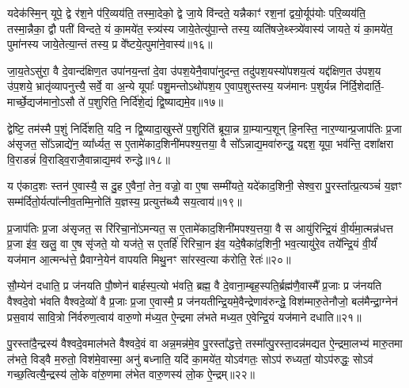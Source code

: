यदेक॑स्मि॒न् यूपे॒ द्वे र॑श॒ने प॑रि॒व्यय॑ति॒ तस्मा॒देको॒ द्वे जा॒ये वि॑न्दते॒ यन्नैकाꣳ॑ रश॒नां द्वयो॒र्यूप॑योः परि॒व्यय॑ति॒ तस्मा॒न्नैका॒ द्वौ पती॑ विन्दते॒ यं का॒मये॑त॒ स्त्र्य॑स्य जाये॒तेत्यु॑पा॒न्ते तस्य॒ व्यति॑षजे॒थ्स्त्र्ये॑वास्य॑ जायते॒ यं का॒मये॑त॒ पुमा॑नस्य जाये॒तेत्या॒न्तं तस्य॒ प्र वे᳚ष्टये॒त्पुमा॑ने॒वास्य॑॥१६॥

जा॒य॒ते\-ऽसु॑रा॒ वै दे॒वान्द॑क्षिण॒त उपा॑नय॒न्तां दे॒वा उ॑पश॒येनै॒वापा॑नुदन्त॒ तदु॑पश॒यस्यो॑पशय॒त्वं यद्द॑क्षिण॒त उ॑पश॒य उ॑प॒शये॒ भ्रातृ॑व्यापनुत्त्यै॒ सर्वे॒ वा अ॒न्ये यूपाः᳚ पशु॒मन्तो\-ऽथो॑पश॒य ए॒वाप॒शुस्तस्य॒ यज॑मानः प॒शुर्यन्न नि॑र्दि॒शेदार्ति॒- मार्च्छे॒द्यज॑मानो॒\-ऽसौ ते॑ प॒शुरिति॒ निर्दि॑शे॒द्यं द्वि॒ष्याद्यमे॒व॥१७॥

द्वेष्टि॒ तम॑स्मै प॒शुं निर्दि॑शति॒ यदि॒ न द्वि॒ष्यादा॒खुस्ते॑ प॒शुरिति॑ ब्रूया॒न्न ग्रा॒म्यान्प॒शून् हि॒नस्ति॒ नार॒ण्यान्प्र॒जाप॑तिः प्र॒जा अ॑सृजत॒ सो᳚\-ऽन्नाद्ये॑न॒ व्या᳚र्ध्यत॒ स ए॒तामे॑काद॒शिनी॑मपश्य॒त्तया॒ वै सो᳚\-ऽन्नाद्य॒मवा॑रुन्द्ध॒ यद्दश॒ यूपा॒ भव॑न्ति॒ दशा᳚क्षरा वि॒राडन्नं॑ वि॒राड्वि॒राजै॒वान्नाद्य॒मव॑ रुन्द्धे॥१८॥

य ए॑काद॒शः स्तन॑ ए॒वास्यै॒ स दु॒ह ए॒वैनां॒ तेन॒ वज्रो॒ वा ए॒षा सम्मी॑यते॒ यदे॑काद॒शिनी॒ सेश्व॒रा पु॒रस्ता᳚त्प्र॒त्यञ्चं॑ य॒ज्ञꣳ सम्म॑र्दितो॒र्यत्पा᳚त्नीव॒तम्मि॒नोति॑ य॒ज्ञस्य॒ प्रत्युत्त॑ब्ध्यै सय॒त्वाय॑॥१९॥

{\anuvakamend[{वै सम॑ष्ट्यै॒ पुमा॑ने॒वास्य॒ यमे॒व रु॑न्धे त्रि॒ꣳ॒शच्च॑॥४॥}]}

प्र॒जाप॑तिः प्र॒जा अ॑सृजत॒ स रि॑रिचा॒नो॑\-ऽमन्यत॒ स ए॒तामे॑काद॒शिनी॑मपश्य॒त्तया॒ वै स आयु॑रिन्द्रि॒यं वी॒र्य॑मा॒त्मन्न॑धत्त प्र॒जा इ॑व॒ खलु॒ वा ए॒ष सृ॑जते॒ यो यज॑ते॒ स ए॒तर्\mbox{}हि॑ रिरिचा॒न इ॑व॒ यदे॒षैका॑द॒शिनी॒ भव॒त्यायु॑रे॒व तये᳚न्द्रि॒यं वी॒र्यं॑ यज॑मान आ॒त्मन्ध॑त्ते॒ प्रैवाग्ने॒येन॑ वापयति मिथु॒नꣳ सा॑रस्व॒त्या क॑रोति॒ रेतः॑॥२०॥

सौ॒म्येन॑ दधाति॒ प्र ज॑नयति पौ॒ष्णेन॑ बार्\mbox{}हस्प॒त्यो भ॑वति॒ ब्रह्म॒ वै दे॒वाना॒म्बृह॒स्पति॒र्ब्रह्म॑णै॒वास्मै᳚ प्र॒जाः प्र ज॑नयति वैश्वदे॒वो भ॑वति वैश्वदे॒व्यो॑ वै प्र॒जाः प्र॒जा ए॒वास्मै॒ प्र ज॑नयतीन्द्रि॒यमे॒वैन्द्रेणाव॑रुन्द्धे॒ विश॑म्मारु॒तेनौजो॒ बल॑मैन्द्रा॒ग्नेन॑ प्रस॒वाय॑ सावि॒त्रो नि॑र्वरुण॒त्वाय॑ वारु॒णो म॑ध्य॒त ऐ॒न्द्रमा ल॑भते मध्य॒त ए॒वेन्द्रि॒यं यज॑माने दधाति॥२१॥

पु॒रस्ता॑दै॒न्द्रस्य॑ वैश्वदे॒वमाल॑भते वैश्वदे॒वं वा अन्न॒मन्न॑मे॒व पु॒रस्ता᳚द्धत्ते॒ तस्मा᳚त्पु॒रस्ता॒दन्न॑मद्यत ऐ॒न्द्रमा॒लभ्य॑ मारु॒तमा ल॑भते॒ विड्वै म॒रुतो॒ विश॑मे॒वास्मा॒ अनु॑ बध्नाति॒ यदि॑ का॒मये॑त॒ यो\-ऽव॑गतः॒ सो\-ऽप॑ रुध्यतां॒ यो\-ऽप॑रुद्धः॒ सो\-ऽव॑ गच्छ॒त्वित्यै॒न्द्रस्य॑ लो॒के वा॑रु॒णमा ल॑भेत वारु॒णस्य॑ लो॒क ऐ॒न्द्रम्॥२२॥

